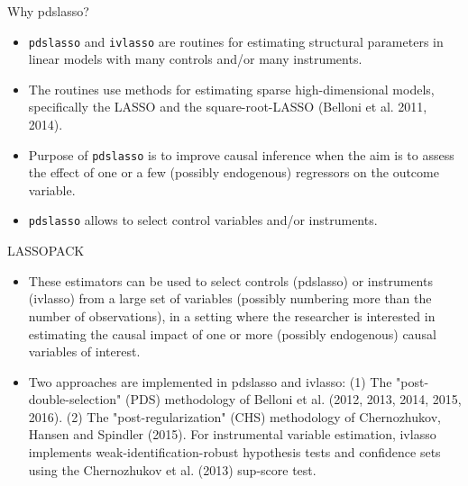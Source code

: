 \documentclass{beamer}
\begin{document}
\begin{frame}{Why pdslasso?}

\begin{itemize}
\item \texttt{pdslasso} and \texttt{ivlasso} are routines for estimating structural parameters in linear models with many controls and/or many instruments. 
\item The routines use methods for estimating sparse high-dimensional models, specifically the LASSO and the square-root-LASSO (Belloni et al. 2011, 2014).
\item Purpose of \texttt{pdslasso}  is to improve causal inference when the aim is to assess the effect of one or a few (possibly endogenous) regressors on the outcome variable. 
\item \texttt{pdslasso}  allows to select control variables and/or instruments.
\end{itemize}

\end{frame}

\begin{frame}{LASSOPACK}


\begin{itemize}
\item These estimators can be used to select controls (pdslasso) or instruments
(ivlasso) from a large set of variables (possibly numbering more than the
number of observations), in a setting where the researcher is interested in
estimating the causal impact of one or more (possibly endogenous) causal
variables of interest.
\item Two approaches are implemented in pdslasso and ivlasso: (1) The "post-
double-selection" (PDS) methodology of Belloni et al. (2012, 2013, 2014,
2015, 2016). (2) The "post-regularization" (CHS) methodology of
Chernozhukov, Hansen and Spindler (2015). For instrumental variable
estimation, ivlasso implements weak-identification-robust hypothesis tests
and confidence sets using the Chernozhukov et al. (2013) sup-score test.
\end{itemize}

\end{frame}
\end{document}
